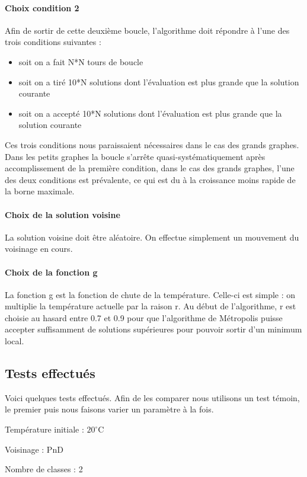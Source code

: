\documentclass[12pt]{article}
\begin{document}
\paragraph{Choix condition 2} Afin de sortir de cette deuxième boucle, l’algorithme doit répondre à l’une des trois conditions suivantes :
	\begin{itemize}
	\item soit on a fait N*N tours de boucle
	\item soit on a tiré 10*N solutions dont l’évaluation est plus grande que la solution courante
	\item soit on a accepté 10*N solutions dont l’évaluation est plus grande que la solution courante
	\end{itemize}
Ces trois conditions nous paraissaient nécessaires dans le cas des grands graphes. Dans les petits graphes la boucle s'arrête quasi-systématiquement après accomplissement de la première condition, dans le cas des grands graphes, l’une des deux conditions est prévalente, ce qui est du à la croissance moins rapide de la borne maximale.


\paragraph{Choix de la solution voisine} La solution voisine doit être aléatoire. On effectue simplement un mouvement du voisinage en cours.
\paragraph{Choix de la fonction g} La fonction g est la fonction de chute de la température. Celle-ci est simple : on multiplie la température actuelle par la raison r. Au début de l’algorithme, r est choisie au hasard entre 0.7 et 0.9 pour que l’algorithme de Métropolis puisse accepter suffisamment de solutions supérieures pour pouvoir sortir d’un minimum local. 

\subsection{Tests effectués}
Voici quelques tests effectués. Afin de les comparer nous utilisons un test témoin, le premier puis nous faisons varier un paramètre à la fois.

\bigskip
Température initiale : $20^\circ$C

Voisinage : PnD

Nombre de classes : 2
\bigskip
\end{document}
